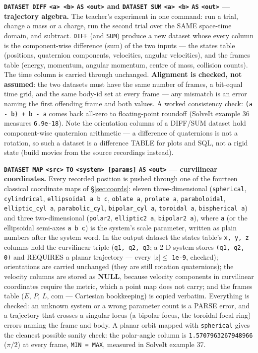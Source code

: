 \documentclass[11pt]{article}
\newcommand{\kw}[1]{\texttt{\uppercase{#1}}}
\newcommand{\code}[1]{\texttt{#1}}
\begin{document}
\textbf{\kw{dataset diff} \code{<a> <b>} \kw{as} \code{<out>} and
\kw{dataset sum} \code{<a> <b>} \kw{as} \code{<out>} --- trajectory
algebra.} The teacher's experiment in one command: run a trial, change
a mass or a charge, run the second trial over the SAME space-time
domain, and subtract. \kw{diff} (and \kw{sum}) produce a new dataset
whose every column is the component-wise difference (sum) of the two
inputs --- the states table (positions, quaternion components,
velocities, angular velocities), and the frames table (energy,
momentum, angular momentum, centre of mass, collision counts). The
time column is carried through unchanged. \textbf{Alignment is
checked, not assumed}: the two datasets must have the same number of
frames, a bit-equal time grid, and the same body-id set at every frame
--- any mismatch is an error naming the first offending frame and both
values. A worked consistency check: \code{(a - b) + b - a} comes back
all-zero to floating-point roundoff (SolveIt example 36 measures
\code{6.9e-18}). Note the orientation columns of a DIFF/SUM dataset
hold component-wise quaternion arithmetic --- a difference of
quaternions is not a rotation, so such a dataset is a difference TABLE
for plots and SQL, not a rigid state (build movies from the source
recordings instead).

\textbf{\kw{dataset map} \code{<src>} \kw{to} \code{<system> [params]}
\kw{as} \code{<out>} --- curvilinear coordinates.} Every recorded
position is pushed through one of the fourteen classical coordinate
maps of \S\ref{sec:coords}: eleven three-dimensional
(\code{spherical}, \code{cylindrical}, \code{ellipsoidal a b c},
\code{oblate a}, \code{prolate a}, \code{paraboloidal},
\code{elliptic\_cyl a}, \code{parabolic\_cyl}, \code{bipolar\_cyl a},
\code{toroidal a}, \code{bispherical a}) and three two-dimensional
(\code{polar2}, \code{elliptic2 a}, \code{bipolar2 a}), where \code{a}
(or the ellipsoidal semi-axes \code{a b c}) is the system's scale
parameter, written as plain numbers after the system word. In the
output dataset the states table's \code{x, y, z} columns hold the
curvilinear triple (\code{q1, q2, q3}; a 2-D system stores
\code{(q1, q2, 0)} and REQUIRES a planar trajectory --- every
$|z| \le$ \code{1e-9}, checked); orientations are carried unchanged
(they are still rotation quaternions); the velocity columns are stored
as \textbf{NULL}, because velocity components in curvilinear
coordinates require the metric, which a point map does not carry; and
the frames table ($E$, $P$, $L$, com --- Cartesian bookkeeping) is
copied verbatim. Everything is checked: an unknown system or a wrong
parameter count is a PARSE error, and a trajectory that crosses a
singular locus (a bipolar focus, the toroidal focal ring) errors
naming the frame and body. A planar orbit mapped with \code{spherical}
gives the cleanest possible sanity check: the polar-angle column is
\code{1.5707963267948966} ($\pi/2$) at every frame, \code{MIN = MAX},
measured in SolveIt example 37.
\end{document}
